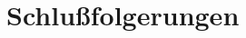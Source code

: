 \documentclass{beamer}
\begin{document}
%    
%    



\section{Schlu{\ss}folgerungen}

\end{document}
